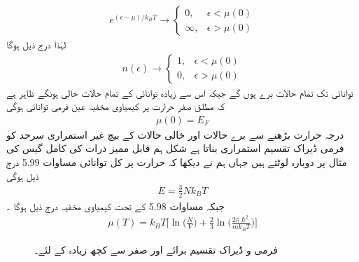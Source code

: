 \begin{align*}
e^{(\epsilon - \mu)/k_B T} \to
\begin{cases}
0 , & \epsilon < \mu (0) \\
\infty , & \epsilon > \mu (0)
\end{cases}
\end{align*}
لہٰذا درج ذیل ہوگا 
\begin{align}
n(\epsilon) \to
\begin{cases}
1, & \epsilon < \mu (0) \\
0, & \epsilon > \mu (0)
\end{cases}
\end{align}
توانائی  تک تمام حالات برے ہوں گے جبکہ اس سے زیادہ توانائی کے تمام حالات خالی ہونگے ظاہر ہے کہ مطلق صفر حرارت پر کیمیاوی مخفیہ عین فرمی توانائی ہوگی 
\begin{align}
\mu (0) = E_F
\end{align}
درجہ حرارت بڑھنے سے برے حالات اور خالی حالات کے بیچ غیر استمراری سرحد کو فرمی ڈیراک تقسیم استمراری بناتا ہے شکل    ہم قابل ممیز ذرات کی کامل گیس کی مثال پر دوبارہ لوٹتے ہیں جہاں ہم نے دیکھا کہ حرارت  پر کل توانائی مساوات 5.99 درج ذیل ہوگی 
\begin{align}
E = \frac{3}{2} N k_B T
\end{align}
جبکہ مساوات 5.98 کے تحت کیمیاوی مخفیہ درج ذیل ہوگا ۔
\begin{align}
\mu (T) = k_B T \big [ \ln\big ( \frac{N}{V} \big ) + \frac{2}{3} \ln\big ( \frac{2 \pi \hslash^2}{m k_B T} \big ) \big ]
\end{align}

\begin{figure}
\centering
{}
\caption{فرمی و  ڈیراک تقسیم برائے  اور صفر سے کچھ  زیادہ  کے لئے۔}
\label{شکل_متماثل_فرمی_ڈیراک_تقسیم}
\end{figure}

